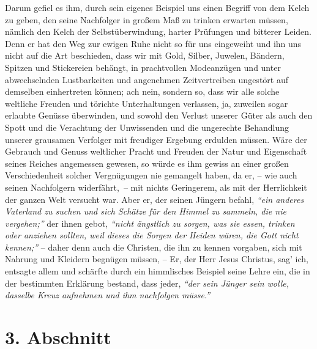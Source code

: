 Darum gefiel es ihm, durch sein eigenes Beispiel uns einen Begriff von dem
Kelch zu geben, den seine Nachfolger in großem Maß zu
trinken erwarten müssen,
nämlich den Kelch der Selbstüberwindung,
harter Prüfungen und bitterer Leiden.
Denn er hat den Weg zur ewigen Ruhe nicht so für uns
eingeweiht und ihn uns
nicht auf die Art beschieden, dass wir mit Gold, Silber, Juwelen, Bändern,
Spitzen und Stickereien behängt, in prachtvollen Modeanzügen und unter
abwechselnden Lustbarkeiten und angenehmen Zeitvertreiben ungestört auf
demselben einhertreten können; ach nein, sondern so, dass wir alle solche
weltliche Freuden und törichte Unterhaltungen verlassen, ja, zuweilen sogar
erlaubte Genüsse überwinden,
und sowohl den Verlust unserer Güter als auch den
Spott und die Verachtung der Unwissenden und die ungerechte Behandlung unserer
grausamen Verfolger mit freudiger Ergebung erdulden
müssen.
Wäre der Gebrauch und Genuss weltlicher Pracht und Freuden der Natur
und Eigenschaft seines Reiches angemessen gewesen, so würde es ihm gewiss an
einer großen Verschiedenheit solcher Vergnügungen nie gemangelt haben, da er, --
wie auch seinen Nachfolgern widerfährt,~-- mit nichts Geringerem, als mit der
Herrlichkeit der ganzen Welt versucht war. Aber er, der seinen Jüngern befahl,
\textit{"`ein anderes Vaterland zu suchen und sich Schätze für den Himmel zu
sammeln, die nie vergehen;"'} der ihnen gebot,
\textit{"`nicht ängstlich zu sorgen, was sie essen,
trinken oder anziehen sollten, weil dieses die Sorgen der Heiden wären,
die Gott nicht kennen;"'} -- daher denn auch die Christen, die ihn zu kennen
vorgaben, sich mit Nahrung und Kleidern begnügen müssen,
-- Er, der Herr Jesus Christus, sag’ ich, entsagte allem und schärfte
durch ein himmlisches Beispiel seine Lehre ein, die in der bestimmten Erklärung
bestand, dass jeder,
\textit{"`der sein Jünger sein wolle, dasselbe Kreuz aufnehmen und
ihm nachfolgen müsse."'}

\section{3. Abschnitt} \label{kap16_ab3}


